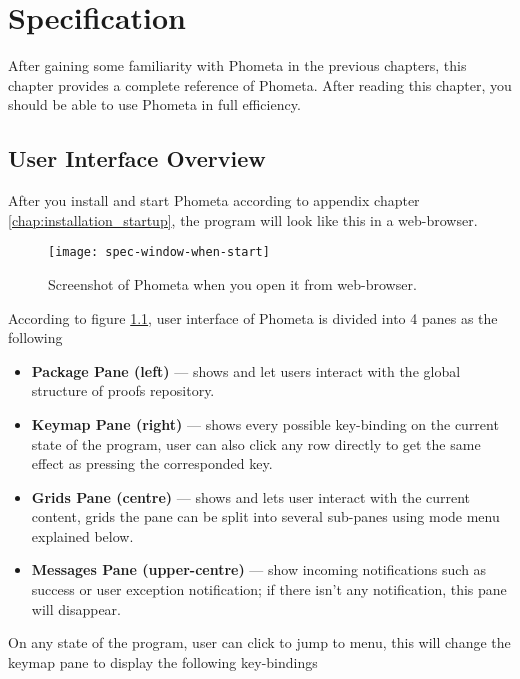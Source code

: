 \documentclass[master.tex]{subfiles}
\begin{document}
\chapter{Specification}
\label{chap:specification}

After gaining some familiarity with Phometa in the previous chapters, this
chapter provides a complete reference of Phometa. After reading this chapter,
you should be able to use Phometa in full efficiency.

\section{User Interface Overview}

After you install and start Phometa according to appendix chapter
\ref{chap:installation_startup}, the program will look like this in a web-browser.

\begin{figure}[H]
    \centering
    \texttt{[image: spec-window-when-start]}
    \caption{Screenshot of Phometa when you open it from web-browser.}
\label{fig:specification-phometa-home-window}
\end{figure}

According to figure \ref{fig:specification-phometa-home-window}, user interface
of Phometa is divided into 4 panes as the following

\begin{itemize}
\item\textbf{Package Pane (left)} --- shows and let users interact with the
  global structure of proofs repository.
\item\textbf{Keymap Pane (right)} --- shows every possible key-binding on the
  current state of the program, user can also click any row directly to get the
  same effect as pressing the corresponded key.
\item\textbf{Grids Pane (centre)} --- shows and lets user interact with the
  current content, grids the pane can be split into several sub-panes using mode
  menu explained below.
\item\textbf{Messages Pane (upper-centre)} --- show incoming notifications such
  as success or user exception notification; if there isn't any notification,
  this pane will disappear.
\end{itemize}

On any state of the program, user can click  to jump to menu,
this will change the keymap pane to display the following key-bindings
\end{document}
